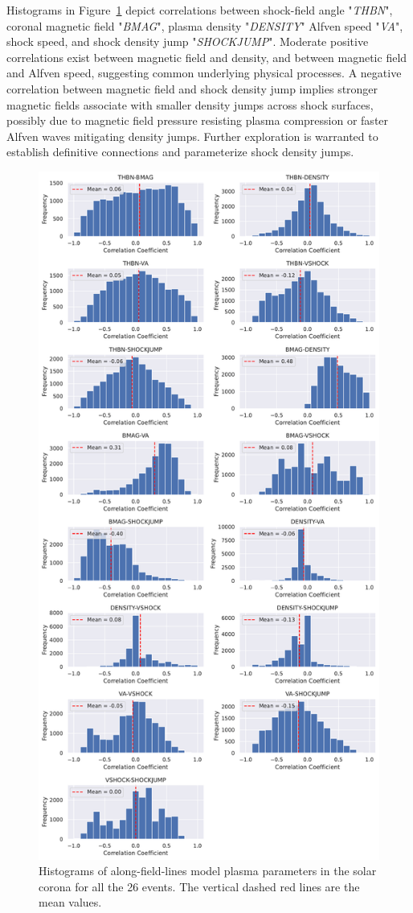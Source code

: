 Histograms in Figure~\ref{fig_hist_plasma_param_corr} depict correlations between shock-field angle "\textit{THBN}", coronal magnetic field "\textit{BMAG}", plasma density "\textit{DENSITY}" Alfven speed "\textit{VA}", shock speed, and shock density jump "\textit{SHOCKJUMP}".
Moderate positive correlations exist between magnetic field and density, and between magnetic field and Alfven speed, suggesting common underlying physical processes.
A negative correlation between magnetic field and shock density jump implies stronger magnetic fields associate with smaller density jumps across shock surfaces, possibly due to magnetic field pressure resisting plasma compression or faster Alfven waves mitigating density jumps.
Further exploration is warranted to establish definitive connections and parameterize shock density jumps.

\begin{figure}[!htp] %
	\centerline{\includegraphics[width=0.7\columnwidth]{chapter2/figs/wp3_d2_Fig16.pdf}}
	\caption{Histograms of along-field-lines model plasma parameters in the solar corona for all the 26 events. The vertical dashed red lines are the mean values.}
	\label{fig_hist_plasma_param_corr}
\end{figure}

